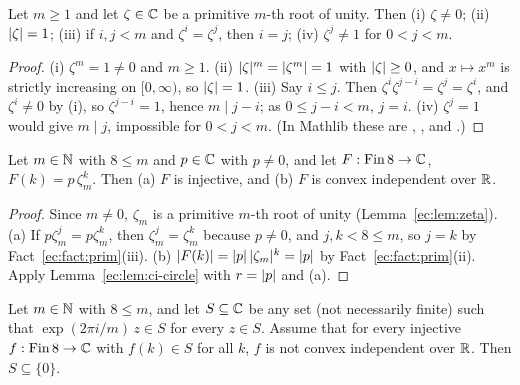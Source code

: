 \begin{fact}\label{ec:fact:prim}
Let $m\ge1$ and let $\zeta\in\mathbb C$ be a primitive $m$-th root of unity. Then
\textup{(i)} $\zeta\ne0$; \textup{(ii)} $\lvert\zeta\rvert=1$; \textup{(iii)} if $i,j<m$ and $\zeta^i=\zeta^j$, then $i=j$;
\textup{(iv)} $\zeta^j\ne1$ for $0<j<m$.
\end{fact}

\begin{proof}
(i) $\zeta^m=1\ne0$ and $m\ge1$. (ii) $\lvert\zeta\rvert^m=\lvert\zeta^m\rvert=1$ with $\lvert\zeta\rvert\ge0$, and $x\mapsto x^m$ is
strictly increasing on $[0,\infty)$, so $\lvert\zeta\rvert=1$. (iii) Say $i\le j$. Then
$\zeta^i\zeta^{j-i}=\zeta^j=\zeta^i$, and $\zeta^i\ne0$ by (i), so $\zeta^{j-i}=1$, hence $m\mid j-i$; as $0\le
j-i<m$, $j=i$. (iv) $\zeta^j=1$ would give $m\mid j$, impossible for $0<j<m$. (In Mathlib these are
, ,  and
.)
\end{proof}

\begin{lemma}\label{ec:lem:orbit8}
Let $m\in\mathbb N$ with $8\le m$ and $p\in\mathbb C$ with $p\ne0$, and let $F:\mathrm{Fin}\,8\to\mathbb C$, $F(k)=p\,\zeta_m^k$. Then
\textup{(a)} $F$ is injective, and \textup{(b)} $F$ is convex independent over $\mathbb R$.
\end{lemma}

\begin{proof}
Since $m\ne0$, $\zeta_m$ is a primitive $m$-th root of unity (Lemma~\ref{ec:lem:zeta}).
(a) If $p\zeta_m^j=p\zeta_m^k$, then $\zeta_m^j=\zeta_m^k$ because $p\ne0$, and $j,k<8\le m$, so $j=k$ by
Fact~\ref{ec:fact:prim}(iii).
(b) $\lvert F(k)\rvert=\lvert p\rvert\,\lvert\zeta_m\rvert^k=\lvert p\rvert$ by Fact~\ref{ec:fact:prim}(ii). Apply Lemma~\ref{ec:lem:ci-circle}
with $r=\lvert p\rvert$ and (a).
\end{proof}

\begin{theorem}\label{ec:thm:big-order}
Let $m\in\mathbb N$ with $8\le m$, and let $S\subseteq\mathbb C$ be any set \textup{(}not necessarily finite\textup{)} such that
$\exp(2\pi i/m)\,z\in S$ for every $z\in S$. Assume that for every injective $f:\mathrm{Fin}\,8\to\mathbb C$ with $f(k)\in S$
for all $k$, $f$ is not convex independent over $\mathbb R$. Then $S\subseteq\{0\}$.
\end{theorem}

